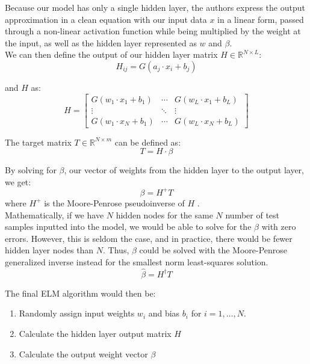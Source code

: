\documentclass[12pt]{article}
\begin{document}
Because our model has only a single hidden layer, the authors express the output approximation in a clean equation with our input data $x$ in a linear form, passed through a non-linear activation function while being multiplied by the weight at the input, as well as the hidden layer represented as $w$ and $\beta$. \\

\noindent We can then define the output of our hidden layer matrix $H \in \mathbb{R}^{N \times L}$:
\begin{equation}
H_{ij} = G(a_j \cdot x_i + b_j)
\end{equation}

\noindent and $H$ as:
\begin{equation}
H = \begin{bmatrix}
G(w_1 \cdot x_1 + b_1) & \cdots & G(w_L \cdot x_1 + b_L) \\
\vdots & \ddots & \vdots \\
G(w_1 \cdot x_N + b_1) & \cdots & G(w_L \cdot x_N + b_L)
\end{bmatrix}
\end{equation}

\noindent The target matrix $T \in \mathbb{R}^{N \times m}$ can be defined as:
\begin{equation}
T = H \cdot \beta
\end{equation}

\noindent By solving for $\beta$, our vector of weights from the hidden layer to the output layer, we get:
\begin{equation}
\beta = H^+ T
\end{equation}
where $H^+$ is the Moore-Penrose pseudoinverse of $H$ \cite{serre2000matrices,rao1972generalized}. \\

Mathematically, if we have $N$ hidden nodes for the same $N$ number of test samples inputted into the model, we would be able to solve for the $\beta$ with zero errors. However, this is seldom the case, and in practice, there would be fewer hidden layer nodes than $N$. Thus, $\beta$ could be solved with the Moore-Penrose generalized inverse instead for the smallest norm least-squares solution.
\begin{equation}
\hat{\beta} = H^{\dagger} T
\end{equation}

\noindent The final ELM algorithm would then be:
\begin{enumerate}
\item Randomly assign input weights $w_i$ and bias $b_i$ for $i = 1, \ldots, N$.
\item Calculate the hidden layer output matrix $H$
\item Calculate the output weight vector $\beta$
\end{enumerate}
\end{document}
